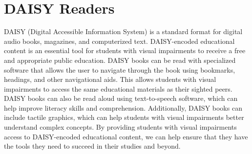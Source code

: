 \documentclass[14pt,letterpaper,twoside]{extreport}
\begin{document}
\hypertarget{text-to-speech-music-podcast}{}\section{DAISY Readers}\label{text-to-speech-music-podcast}
DAISY (Digital Accessible Information System) is a standard format for digital audio books, magazines, and computerized text. DAISY-encoded educational content is an essential tool for students with visual impairments to receive a free and appropriate public education. DAISY books can be read with specialized software that allows the user to navigate through the book using bookmarks, headings, and other navigational aids. This allows students with visual impairments to access the same educational materials as their sighted peers. DAISY books can also be read aloud using text-to-speech software, which can help improve literacy skills and comprehension. Additionally, DAISY books can include tactile graphics, which can help students with visual impairments better understand complex concepts. By providing students with visual impairments access to DAISY-encoded educational content, we can help ensure that they have the tools they need to succeed in their studies and beyond.
\end{document}
